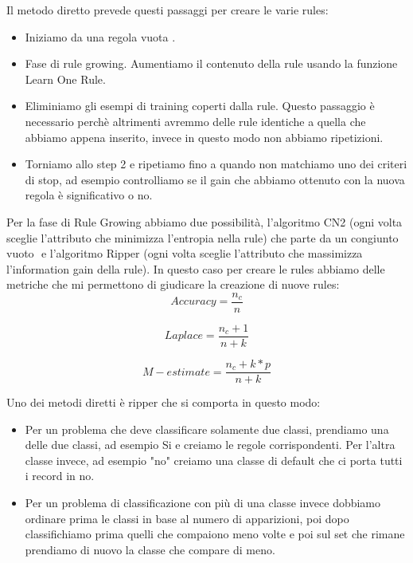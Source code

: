 \documentclass[14pt]{extreport}
\begin{document}
Il metodo diretto prevede questi passaggi per creare le varie rules:
\begin{itemize}
    \item Iniziamo da una regola vuota ${}$.
    \item Fase di rule growing. Aumentiamo il contenuto della rule usando la funzione Learn One Rule.
    \item Eliminiamo gli esempi di training coperti dalla rule. Questo passaggio è necessario perchè altrimenti avremmo delle rule identiche a quella che abbiamo appena inserito, invece in questo modo non abbiamo ripetizioni.
    \item Torniamo allo step 2 e ripetiamo fino a quando non matchiamo uno dei criteri di stop, ad esempio controlliamo se il gain che abbiamo ottenuto con la nuova regola è significativo o no.
\end{itemize}

Per la fase di Rule Growing abbiamo due possibilità, l'algoritmo CN2 (ogni volta sceglie l'attributo che minimizza l'entropia nella rule) che parte da un congiunto vuoto ${}$ e l'algoritmo Ripper (ogni volta sceglie l'attributo che massimizza l'information gain della rule).
In questo caso per creare le rules abbiamo delle metriche che mi permettono di giudicare la creazione di nuove rules:
\begin{equation}
    Accuracy = \frac{n_c}{n}
\end{equation}

\begin{equation}
    Laplace = \frac{n_c + 1}{n + k}
\end{equation}

\begin{equation}
    M-estimate = \frac{n_c + k*p}{n + k}
\end{equation}

Uno dei metodi diretti è ripper che si comporta in questo modo:
\begin{itemize}
    \item Per un problema che deve classificare solamente due classi, prendiamo una delle due classi, ad esempio Si e creiamo le regole corrispondenti. Per l'altra classe invece, ad esempio "no" creiamo una classe di default che ci porta tutti i record in no.
    \item Per un problema di classificazione con più di una classe invece dobbiamo ordinare prima le classi in base al numero di apparizioni, poi dopo classifichiamo prima quelli che compaiono meno volte e poi sul set che rimane prendiamo di nuovo la classe che compare di meno.
\end{itemize}
\end{document}

